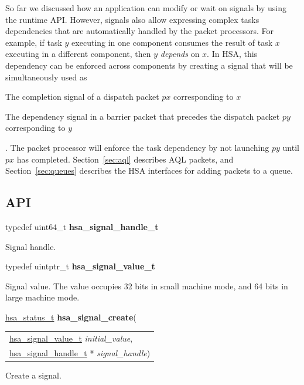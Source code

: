 \documentclass[final]{book}
\newcommand{\hsaarg}[1]{\textit{#1}}
\begin{document}
So far we discussed how an application can modify or wait on signals by using
the runtime API. However, signals also allow expressing complex tasks
dependencies that are automatically handled by the packet processors. For
example, if task $y$ executing in one component consumes the result of task $x$
executing in a different component, then $y$ \textit{depends} on $x$. In HSA,
this dependency can be enforced across components by creating a signal that will
be simultaneously used as \begin{inparaenum}[a\upshape)] \item The completion
  signal of a dispatch packet $px$ corresponding to $x$ \item The dependency
  signal in a barrier packet that precedes the dispatch packet $py$
  corresponding to $y$\end{inparaenum}. The packet processor will enforce the
task dependency by not launching $py$ until $px$ has completed.
Section~\ref{sec:aql} describes AQL packets, and Section~\ref{sec:queues}
describes the HSA interfaces for adding packets to a queue.

\subsection{API}
\makeatletter{}

\noindent\begin{tcolorbox}[nobeforeafter,arc=0mm,colframe=white,colback=lightgray,left=0mm]
typedef uint64_t  \hypertarget{group__signals_1ga6592c136d70853d855bc11d9efdbf534}{\textbf{hsa_signal_handle_t}}
\end{tcolorbox}
Signal handle.
\\

\noindent\begin{tcolorbox}[nobeforeafter,arc=0mm,colframe=white,colback=lightgray,left=0mm]
typedef uintptr_t  \hypertarget{group__signals_1gacdf7a070a2f988bcf97904a1f5d0e573}{\textbf{hsa_signal_value_t}}
\end{tcolorbox}
Signal value. The value occupies 32 bits in small machine mode, and 64 bits in large machine mode.
\\

\noindent\begin{tcolorbox}[breakable,nobeforeafter,colframe=white,colback=lightgray,left=0mm]
\hyperlink{group__status_1gad755322e7ff95456520e8abdbe90d225}{hsa_status_t} \hypertarget{group__signals_1gac64f085f639ba66a8d28f008cc39724b}{\textbf{hsa_signal_create}}(
\vspace{-3.5mm}\begin{longtable}{@{}p{\textwidth}}
\hspace{1.7em}\hyperlink{group__signals_1gacdf7a070a2f988bcf97904a1f5d0e573}{hsa_signal_value_t} \hsaarg{initial_value},\\
\hspace{1.7em}\hyperlink{group__signals_1ga6592c136d70853d855bc11d9efdbf534}{hsa_signal_handle_t} * \hsaarg{signal_handle})\end{longtable}

\end{tcolorbox}
Create a signal.
\end{document}
